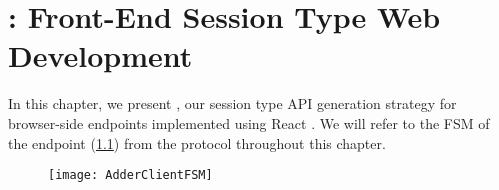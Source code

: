 \chapter{: Front-End Session Type Web Development}
\label{chap:react}

In this chapter, we present ,
our session type API generation strategy for browser-side endpoints
implemented using React \cite{React}.
We will refer to the FSM of the 
endpoint (\cref{fig:adderclientfsm})
from the  protocol 
throughout this chapter.

\begin{figure}[!b]
\centering
\texttt{[image: AdderClientFSM]}
\label{fig:adderclientfsm}
\end{figure}








